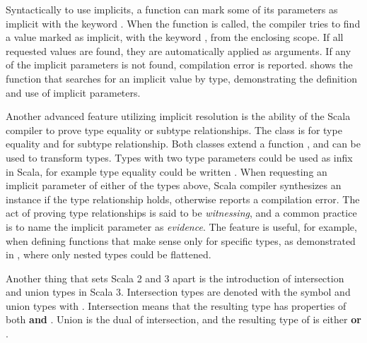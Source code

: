 Syntactically to use implicits, a function can mark some of its parameters as implicit with the keyword . When the function is called, the compiler tries to find a value marked as implicit, with the keyword , from the enclosing scope. If all requested values are found, they are automatically applied as arguments. If any of the implicit parameters is not found, compilation error is reported.  shows the function  that searches for an implicit value by type, demonstrating the definition and use of implicit parameters.



Another advanced feature utilizing implicit resolution is the ability of the Scala compiler to prove type equality or subtype relationships. The class \inlinescala{=:=[From, To]} is for type equality and \inlinescala{<:<[From, To]} for subtype relationship. Both classes extend a function , and can be used to transform types. Types with two type parameters could be used as infix in Scala, for example type equality could be written . When requesting an implicit parameter of either of the types above, Scala compiler synthesizes an instance if the type relationship holds, otherwise reports a compilation error. The act of proving type relationships is said to be \textit{witnessing}, and a common practice is to name the implicit parameter as \textit{evidence}. The feature is useful, for example, when defining functions that make sense only for specific types, as demonstrated in , where only nested  types could be flattened.



Another thing that sets Scala 2 and 3 apart is the introduction of intersection and union types in Scala 3. Intersection types are denoted with the \inlinecode{&} symbol and union types with \inlinecode{|}. Intersection  means that the resulting type has properties of both  \textbf{and} . Union is the dual of intersection, and the resulting type of  is either  \textbf{or} .

